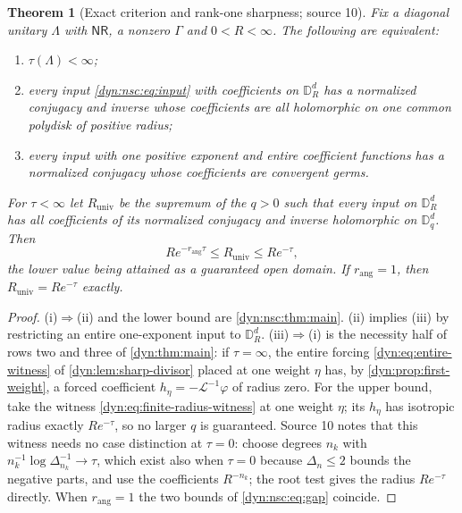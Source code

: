 \documentclass[11pt,letterpaper]{article}
\newtheorem{theorem}{Theorem}[section]
\theoremstyle{definition}
\theoremstyle{remark}
\newcommand{\Li}{\mathcal L}
\newcommand{\nres}{\mathsf{NR}}
\newcommand{\rang}{r_{\mathrm{ang}}}
\numberwithin{equation}{section}
\begin{document}
\begin{theorem}[Exact criterion and rank-one sharpness; source 10]
\label{dyn:nsc:thm:criterion}
Fix a diagonal unitary $\Lambda$ with $\nres$, a nonzero $\Gamma$ and
$0<R<\infty$. The following are equivalent:
\begin{enumerate}[label=(\roman*)]
\item $\tau(\Lambda)<\infty$;
\item every input \eqref{dyn:nsc:eq:input} with coefficients on
$\mathbb D_R^{d}$ has a normalized conjugacy and inverse whose coefficients
are all holomorphic on one common polydisk of positive radius;
\item every input with one positive exponent and entire coefficient
functions has a normalized conjugacy whose coefficients are convergent
germs.
\end{enumerate}
For $\tau<\infty$ let $R_{\mathrm{univ}}$ be the supremum of the $q>0$ such
that every input on $\mathbb D_R^{d}$ has all coefficients of its normalized
conjugacy and inverse holomorphic on $\mathbb D_q^{d}$. Then
\begin{equation}\label{dyn:nsc:eq:gap}
 Re^{-\rang\tau}\le R_{\mathrm{univ}}\le Re^{-\tau},
\end{equation}
the lower value being attained as a guaranteed open domain. If $\rang=1$,
then $R_{\mathrm{univ}}=Re^{-\tau}$ exactly.
\end{theorem}
\begin{proof}
(i)$\Rightarrow$(ii) and the lower bound are \cref{dyn:nsc:thm:main}. (ii)
implies (iii) by restricting an entire one-exponent input to $\mathbb D_R^{d}$.
(iii)$\Rightarrow$(i) is the necessity half of rows two and three of
\cref{dyn:thm:main}: if $\tau=\infty$, the entire forcing
\eqref{dyn:eq:entire-witness} of \cref{dyn:lem:sharp-divisor} placed at one
weight $\eta$ has, by \cref{dyn:prop:first-weight}, a forced coefficient
$h_\eta=-\Li^{-1}\varphi$ of radius zero. For the upper bound, take the
witness \eqref{dyn:eq:finite-radius-witness} at one weight $\eta$; its
$h_\eta$ has isotropic radius exactly $Re^{-\tau}$, so no larger
$q$ is guaranteed. Source 10 notes that this witness needs no case
distinction at $\tau=0$: choose degrees $n_k$ with
$n_k^{-1}\log\Delta_{n_k}^{-1}\to\tau$, which exist also when $\tau=0$
because $\Delta_n\le2$ bounds the negative parts, and use the coefficients
$R^{-n_k}$; the root test gives the radius $Re^{-\tau}$ directly. When
$\rang=1$ the two bounds of \eqref{dyn:nsc:eq:gap} coincide.
\end{proof}
\end{document}
